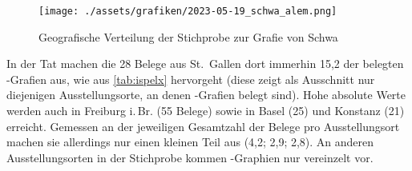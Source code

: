 \begin{figure}
\centering
\texttt{[image: ./assets/grafiken/2023-05-19\_schwa\_alem.png]}
\caption{Geografische Verteilung der Stichprobe zur Grafie von Schwa\nocite{wiesinger1983:rede}}
\label{fig:caoalemschwa}
\end{figure}

In der Tat machen die 28 Belege aus St.~Gallen dort immerhin 15,2\pct{} der
belegten -Grafien aus, wie aus \cref{tab:ispelx} hervorgeht (diese zeigt
als Ausschnitt nur diejenigen Ausstellungsorte, an denen -Grafien
belegt sind). Hohe absolute Werte werden auch in Freiburg i.\,Br. (55 Belege)
sowie in Basel (25) und Konstanz (21) erreicht. Gemessen an der jeweiligen
Gesamtzahl der Belege pro Ausstellungsort machen sie allerdings nur einen
kleinen Teil aus (4,2\pct; 2,9\pct; 2,8\pct). An anderen Ausstellungsorten in
der Stichprobe kommen -Graphien nur vereinzelt vor.

